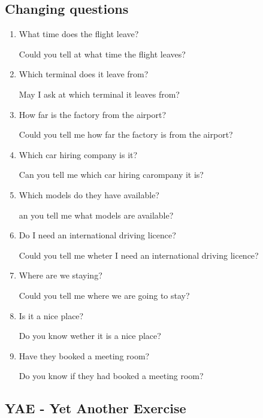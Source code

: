 \documentclass[a4paper,11pt]{scrartcl}%
\begin{document}
	\subsection{Changing questions}
		\begin{enumerate}
			\item What time does the flight leave?\par
				Could you tell at what time the flight leaves?
			\item Which terminal does it leave from?\par
				May I ask at which terminal it leaves from?
			\item How far is the factory from the airport?\par
				Could you tell me how far the factory is from the airport?
			\item Which car hiring company is it?\par
				Can you tell me which car hiring carompany it is?
			\item Which models do they have available?\par
				an you tell me what models are available?
			\item Do I need an international driving licence?\par
				Could you tell me wheter I need an international driving licence?
			\item Where are we staying?\par
				Could you tell me where we are going to stay?
			\item Is it a nice place?\par
				Do you know wether it is a nice place?
			\item Have they booked a meeting room?\par
				Do you know if they had booked a meeting room?
		\end{enumerate}

	\subsection{YAE - Yet Another Exercise}
	
\end{document}
